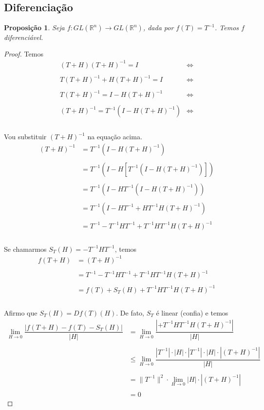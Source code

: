 \documentclass{article}
\theoremstyle{plain}
\newtheorem{prop}{Proposição}[section]
\theoremstyle{definition}
\theoremstyle{remark}
\begin{document}
\subsection{Diferenciação}
\begin{prop}
Seja $f: GL(\mathbb{R}^n) \to GL(\mathbb{R}^n)$, dada por $f(T) = T^{-1}$.  Temos $f$ diferenciável.
\end{prop}
	\begin{proof}
	Temos  \begin{align*}
(T+H)(T+H)^{-1} = I &\iff \\~\\
T(T+H)^{-1} +H(T+H)^{-1} = I &\iff \\~\\
T(T+H)^{-1} = I -H(T+H)^{-1} &\iff \\~\\
(T+H)^{-1} = T^{-1}  ( I -H(T+H)^{-1} )  &\iff \\~\\
\end{align*}

Vou substituir $(T+H)^{-1}$ na equação acima.\begin{align*}
(T+H)^{-1} &= T^{-1}  ( I -H(T+H)^{-1} )   \\~\\
 &= T^{-1}  ( I -H \left[T^{-1}  ( I -H(T+H)^{-1} )\right])   \\~\\
 &= T^{-1}  ( I -H T^{-1}  ( I -H(T+H)^{-1} ))   \\~\\
 &= T^{-1}  ( I -H T^{-1}   +HT^{-1}H(T+H)^{-1} )   \\~\\
 &= T^{-1}   -T^{-1}H T^{-1}   +T^{-1}HT^{-1}H(T+H)^{-1}    \\~\\
\end{align*}

Se chamarmos $S_T(H) = -T^{-1}HT^{-1}$, temos \begin{align*}
f(T+H) &= (T+H)^{-1}    \\~\\
 &= T^{-1}   -T^{-1}H T^{-1}   +T^{-1}HT^{-1}H(T+H)^{-1}    \\~\\
 &= f(T)   +S_T(H)   +T^{-1}HT^{-1}H(T+H)^{-1}    \\~\\
\end{align*}

Afirmo que $S_T(H) = Df(T)(H)$. De fato, $S_T$ é linear (confia) e temos \begin{align*}
\displaystyle\lim_{H\to 0} \dfrac{| f(T+H) - f(T) - S_T(H)|}{|H|} &= \displaystyle\lim_{H\to 0}\dfrac{| +T^{-1}HT^{-1}H(T+H)^{-1} |}{|H|} \\~\\
&\leq \displaystyle\lim_{H \to 0}\dfrac{|T^{-1}|\cdot |H|\cdot |T^{-1}| \cdot |H| \cdot |(T+H)^{-1}|}{|H|} \\~\\
&= \|T^{-1}\|^2\cdot \displaystyle\lim_{H \to 0}|H| \cdot |(T+H)^{-1}| \\~\\
&=0
\end{align*}
	\end{proof}
\end{document}
